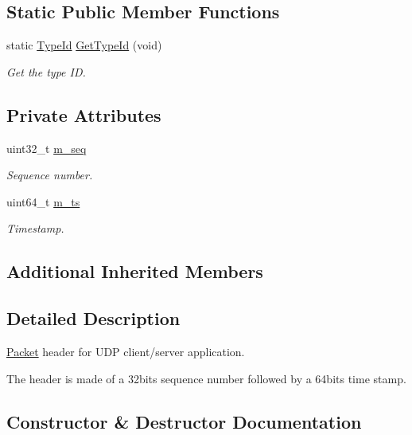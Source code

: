 \subsection*{Static Public Member Functions}
\begin{DoxyCompactItemize}
\item 
static \hyperlink{classns3_1_1TypeId}{Type\+Id} \hyperlink{classns3_1_1SeqTsHeader_a93ebc5242bc058f8f8ffdfac5f97bf01}{Get\+Type\+Id} (void)
\begin{DoxyCompactList}\small\item\em Get the type ID. \end{DoxyCompactList}\end{DoxyCompactItemize}
\subsection*{Private Attributes}
\begin{DoxyCompactItemize}
\item 
uint32\+\_\+t \hyperlink{classns3_1_1SeqTsHeader_a38b5d3673d0e31d7b4b0037294c1a1f3}{m\+\_\+seq}
\begin{DoxyCompactList}\small\item\em Sequence number. \end{DoxyCompactList}\item 
uint64\+\_\+t \hyperlink{classns3_1_1SeqTsHeader_a19c9ed228266ee535971312298dfe92c}{m\+\_\+ts}
\begin{DoxyCompactList}\small\item\em Timestamp. \end{DoxyCompactList}\end{DoxyCompactItemize}
\subsection*{Additional Inherited Members}


\subsection{Detailed Description}
\hyperlink{classns3_1_1Packet}{Packet} header for U\+DP client/server application. 

The header is made of a 32bits sequence number followed by a 64bits time stamp. 

\subsection{Constructor \& Destructor Documentation}
